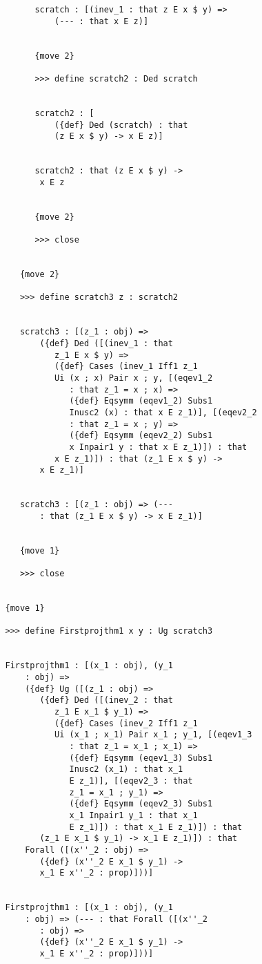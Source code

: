 \documentclass[12pt]{article}
\begin{document}
\begin{verbatim}
         scratch : [(inev_1 : that z E x $ y) => 
             (--- : that x E z)]


         {move 2}

         >>> define scratch2 : Ded scratch


         scratch2 : [
             ({def} Ded (scratch) : that 
             (z E x $ y) -> x E z)]


         scratch2 : that (z E x $ y) -> 
          x E z


         {move 2}

         >>> close


      {move 2}

      >>> define scratch3 z : scratch2


      scratch3 : [(z_1 : obj) => 
          ({def} Ded ([(inev_1 : that 
             z_1 E x $ y) => 
             ({def} Cases (inev_1 Iff1 z_1 
             Ui (x ; x) Pair x ; y, [(eqev1_2 
                : that z_1 = x ; x) => 
                ({def} Eqsymm (eqev1_2) Subs1 
                Inusc2 (x) : that x E z_1)], [(eqev2_2 
                : that z_1 = x ; y) => 
                ({def} Eqsymm (eqev2_2) Subs1 
                x Inpair1 y : that x E z_1)]) : that 
             x E z_1)]) : that (z_1 E x $ y) -> 
          x E z_1)]


      scratch3 : [(z_1 : obj) => (--- 
          : that (z_1 E x $ y) -> x E z_1)]


      {move 1}

      >>> close


   {move 1}

   >>> define Firstprojthm1 x y : Ug scratch3


   Firstprojthm1 : [(x_1 : obj), (y_1 
       : obj) => 
       ({def} Ug ([(z_1 : obj) => 
          ({def} Ded ([(inev_2 : that 
             z_1 E x_1 $ y_1) => 
             ({def} Cases (inev_2 Iff1 z_1 
             Ui (x_1 ; x_1) Pair x_1 ; y_1, [(eqev1_3 
                : that z_1 = x_1 ; x_1) => 
                ({def} Eqsymm (eqev1_3) Subs1 
                Inusc2 (x_1) : that x_1 
                E z_1)], [(eqev2_3 : that 
                z_1 = x_1 ; y_1) => 
                ({def} Eqsymm (eqev2_3) Subs1 
                x_1 Inpair1 y_1 : that x_1 
                E z_1)]) : that x_1 E z_1)]) : that 
          (z_1 E x_1 $ y_1) -> x_1 E z_1)]) : that 
       Forall ([(x''_2 : obj) => 
          ({def} (x''_2 E x_1 $ y_1) -> 
          x_1 E x''_2 : prop)]))]


   Firstprojthm1 : [(x_1 : obj), (y_1 
       : obj) => (--- : that Forall ([(x''_2 
          : obj) => 
          ({def} (x''_2 E x_1 $ y_1) -> 
          x_1 E x''_2 : prop)]))]



\end{verbatim}
\end{document}
